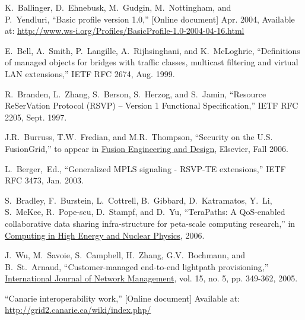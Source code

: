 \documentclass[conference]{IEEEtran}
\begin{document}
%
%
%
\begin{thebibliography}{1}

K.~Ballinger, D.~Ehnebusk, M.~Gudgin, M.~Nottingham, and~~~~\\
P.~Yendluri, ``Basic profile version 1.0,'' [Online document] Apr. 2004,
Available at:
\url{http://www.ws-i.org/Profiles/BasicProfile-1.0-2004-04-16.html}

E.~Bell, A.~Smith, P.~Langille, A.~Rijhsinghani, and K.~McLoghrie,
``Definitions of managed objects for bridges with traffic classes, multicast
filtering and virtual LAN extensions,''
IETF RFC 2674, Aug. 1999.

R.~Branden, L.~Zhang, S.~Berson, S.~Herzog, and S.~Jamin,
``Resource ReSerVation Protocol (RSVP) -- Version 1 Functional
Specification,'' IETF RFC 2205, Sept. 1997.

J.R.~Burruss, T.W.~Fredian, and M.R.~Thompson,
``Security on the U.S. FusionGrid,''
to appear in \underline{Fusion Engineering and Design}, Elsevier, Fall 2006.

L.~Berger,~Ed.,
``Generalized MPLS signaling - RSVP-TE extensions,''
IETF RFC 3473, Jan. 2003.
 
S.~Bradley, F.~Burstein, L.~Cottrell, B.~Gibbard, D.~Katramatos, Y.~Li,
S.~McKee, R.~Pope-scu, D.~Stampf, and D.~Yu,
``TeraPaths: A QoS-enabled collaborative data sharing infra-structure for
peta-scale computing research,''
in \underline{Computing in High Energy and Nuclear Physics}, 2006.

J.~Wu, M.~Savoie, S.~Campbell, H.~Zhang, G.V.~Bochmann, and B.~St.~Arnaud,
``Customer-managed end-to-end lightpath provisioning,''
\underline{International Journal of Network Management},
vol. 15, no. 5, pp. 349-362, 2005.

``Canarie interoperability work,'' [Online document] Available at: \\
\url{http://grid2.canarie.ca/wiki/index.php/}


\end{thebibliography}
\end{document}
